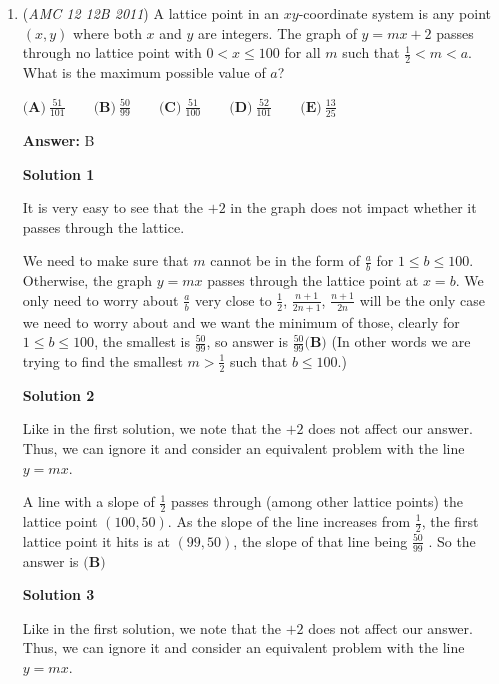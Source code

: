 \begin{enumerate}
 \textbf{AMC 10} (For eventual redirection of one of the two pages.) This is also \#22 on the corresponding AMC 10B.

 


	\item (\textit{AMC 12 12B 2011}) A lattice point in an $xy$-coordinate system is any point $(x, y)$ where both $x$ and $y$ are integers. The graph of $y = mx + 2$ passes through no lattice point with $0 < x \leq 100$ for all $m$ such that $\frac{1}{2} < m < a$. What is the maximum possible value of $a$?


 $\textbf{(A)}\ \frac{51}{101} \qquad \textbf{(B)}\ \frac{50}{99} \qquad \textbf{(C)}\ \frac{51}{100} \qquad \textbf{(D)}\ \frac{52}{101} \qquad \textbf{(E)}\ \frac{13}{25}$

 \textbf{Answer: }B



\textbf{Solution 1}

It is very easy to see that the $+2$ in the graph does not impact whether it passes through the lattice. 

 We need to make sure that $m$ cannot be in the form of $\frac{a}{b}$ for $1\le b\le 100$. Otherwise, the graph $y= mx$ passes through the lattice point at $x = b$. We only need to worry about $\frac{a}{b}$ very close to $\frac{1}{2}$, $\frac{n+1}{2n+1}$, $\frac{n+1}{2n}$ will be the only case we need to worry about and we want the minimum of those, clearly for  $1\le b\le 100$, the smallest is $\frac{50}{99}$, so answer is $\boxed{\frac{50}{99} \textbf{(B)}}$ (In other words we are trying to find the smallest $m>\frac{1}{2}$ such that $b\le 100$.)

 



\textbf{Solution 2}

Like in the first solution, we note that the $+2$ does not affect our answer. Thus, we can ignore it and consider an equivalent problem with the line $y = mx$.

 A line with a slope of $\frac{1}{2}$ passes through (among other lattice points) the lattice point $(100,50)$. As the slope of the line increases from $\frac{1}{2}$, the first lattice point it hits is at $(99, 50)$, the slope of that line being $\frac{50}{99}$ . So the answer is $\boxed{\textbf{(B)}}$




\textbf{Solution 3}

Like in the first solution, we note that the $+2$ does not affect our answer. Thus, we can ignore it and consider an equivalent problem with the line $y = mx$.


\end{enumerate}
